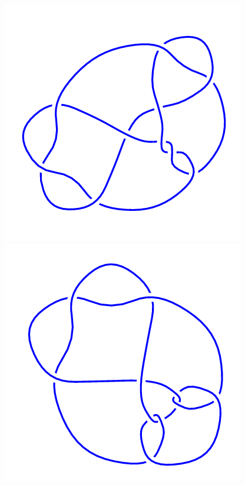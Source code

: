 \begin{figure}[H]
    \begin{minipage}[b]{.18\linewidth}
        \centering
        \includegraphics[width=\linewidth]{../data/10_142.png}
    \end{minipage}
    \begin{minipage}[b]{.18\linewidth}
        \centering
        \includegraphics[width=\linewidth]{../data/10_143.png}

\end{minipage}
\end{figure}
